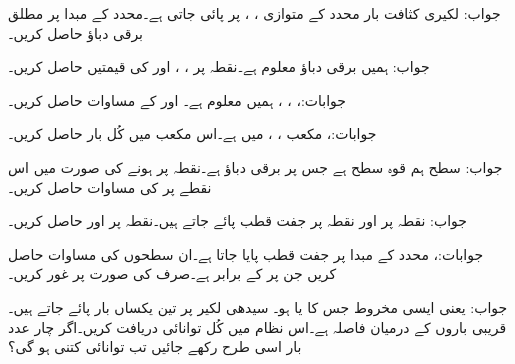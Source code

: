 جواب:
لکیری کثافت بار  محدد  کے متوازی ، ،  پر پائی جاتی ہے۔محدد کے مبدا پر مطلق برقی دباؤ حاصل کریں۔

جواب:
ہمیں برقی دباؤ  معلوم ہے۔نقطہ  پر ، ،  اور  کی قیمتیں حاصل کریں۔

جوابات:، ،
 ، 
ہمیں  معلوم ہے۔ اور  کے مساوات حاصل کریں۔

جوابات:، 
مکعب ، ،  میں  ہے۔اس مکعب میں کُل بار حاصل کریں۔

جواب:
سطح  ہم قوہ سطح ہے جس پر برقی دباؤ  ہے۔نقطہ  پر  ہونے کی صورت میں اس نقطے پر  کی مساوات حاصل کریں۔

جواب: 
نقطہ  پر  اور نقطہ  پر  جفت قطب پائے جاتے ہیں۔نقطہ  پر  اور  حاصل کریں۔

جوابات:، 
محدد کے مبدا پر  جفت قطب پایا جاتا ہے۔ان سطحوں کی مساوات حاصل کریں جن پر  کے برابر ہے۔صرف  کی صورت پر غور کریں۔

جواب: یعنی ایسی مخروط جس کا  یا  ہو۔ 
سیدھی لکیر پر تین یکساں بار  پائے جاتے ہیں۔قریبی باروں کے درمیان فاصلہ  ہے۔اس نظام میں کُل توانائی دریافت کریں۔اگر چار عدد بار اسی طرح رکھے جائیں تب توانائی کتنی ہو گی؟

